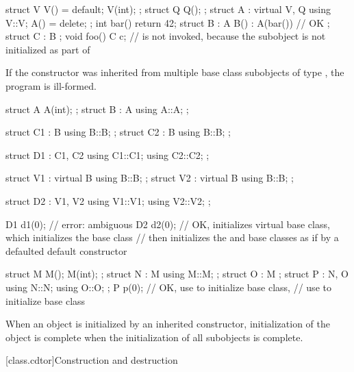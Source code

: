 \begin{example}
\begin{codeblock}
struct V { V() = default; V(int); };
struct Q { Q(); };
struct A : virtual V, Q {
  using V::V;
  A() = delete;
};
int bar() { return 42; }
struct B : A {
  B() : A(bar()) {} // OK
};
struct C : B {};
void foo() { C c; } //  is not invoked, because the  subobject is not initialized as part of 
\end{codeblock}
\end{example}

\pnum
If the constructor was inherited from multiple base class subobjects
of type , the program is ill-formed.
\begin{example}
\begin{codeblock}
struct A { A(int); };
struct B : A { using A::A; };

struct C1 : B { using B::B; };
struct C2 : B { using B::B; };

struct D1 : C1, C2 {
  using C1::C1;
  using C2::C2;
};

struct V1 : virtual B { using B::B; };
struct V2 : virtual B { using B::B; };

struct D2 : V1, V2 {
  using V1::V1;
  using V2::V2;
};

D1 d1(0);           // error: ambiguous
D2 d2(0);           // OK, initializes virtual  base class, which initializes the  base class
                    // then initializes the  and  base classes as if by a defaulted default constructor

struct M { M(); M(int); };
struct N : M { using M::M; };
struct O : M {};
struct P : N, O { using N::N; using O::O; };
P p(0);             // OK, use  to initialize  base class,
                    // use  to initialize  base class
\end{codeblock}
\end{example}

\pnum
When an object is initialized by an inherited constructor,
initialization of the object is complete
when the initialization of all subobjects is complete.%

[class.cdtor]{Construction and destruction}%
%
%

